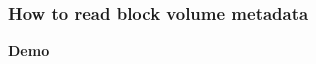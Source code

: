 \documentclass[10pt,utf8]{beamer}
\begin{document}
\begin{frame}
  \frametitle{How to read block volume metadata}
	\centering
	\huge{\textbf{Demo}}
\end{frame}

% 
% 
% 
% 
\end{document}
